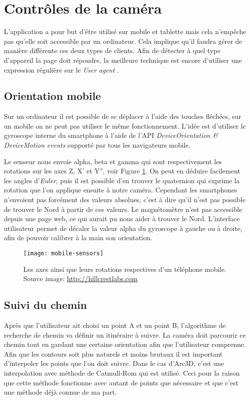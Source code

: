\section{Contrôles de la caméra}
L'application a pour but d'être utilisé sur mobile et tablette mais cela n'empêche pas qu'elle soit accessible par un ordinateur. Cela implique qu'il faudra gérer de manière différente ces deux types de clients. Afin de détecter à quel type d'appareil la page doit répondre, la meilleure technique est encore d'utiliser une expression régulière sur le \emph{User agent} \cite{wiki-useragent}.

\subsection{Orientation mobile}
Sur un ordinateur il est possible de se déplacer à l'aide des touches fléchées, sur un mobile on ne peut pas utiliser le même fonctionnement. L'idée est d'utiliser le gyroscope interne du smartphone à l'aide de l'API \emph{DeviceOrientation \& DeviceMotion events}\cite{w3c-orientation} supporté par tous les navigateurs mobile\cite{caniuse-DeviceMotion}. 

Le senseur nous envoie alpha, beta et gamma qui sont respectivement les rotations sur les axes Z, X' et Y'', voir Figure \ref{fig:mobile-angles}. On peut en déduire facilement les angles d'\emph{Euler}, puis il est possible d'en trouver le quaternion qui exprime la rotation que l'on applique ensuite à notre caméra. Cependant les smartphones n'envoient pas forcément des valeurs absolues, c'est à dire qu'il n'est pas possible de trouver le Nord à partir de ces valeurs. Le magnétomètre n'est pas accessible depuis une page web, ce qui aurait pu nous aider à trouver le Nord. L'interface utilisateur permet de décaler la valeur alpha du gyroscope à gauche ou à droite, afin de pouvoir calibrer à la main son orientation.

\begin{figure}
	\centering
	\texttt{[image: mobile-sensors]}
	\caption{Les axes ainsi que leurs rotations respectives d'un téléphone mobile. Source image: \url{http://hillcrestlabs.com}}
	\label{fig:mobile-angles}
\end{figure}

\subsection{Suivi du chemin}
Après que l'utilisateur ait choisi un point A et un point B, l'algorithme de recherche de chemin va définir un itinéraire à suivre. La caméra doit parcourir ce chemin tout en gardant une certaine orientation afin que l'utilisateur comprenne. Afin que les contours soit plus naturels et moins brutaux il est important d'interpoler les points que l'on doit suivre. Dans le cas d'Arc3D, c'est une interpolation avec méthode de Catmull-Rom qui est utilisé. Ceci pour la raison que cette méthode fonctionne avec autant de points que nécessaire et que c'est une méthode déjà connue de ma part.

